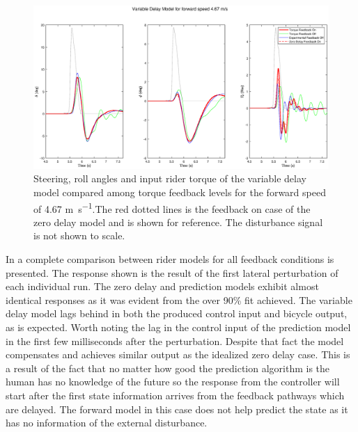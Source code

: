 \begin{figure}[!h]
    \centering
    \captionsetup{justification=centering,margin=2cm}

    \includegraphics[width=\textwidth]{images/predict_delay_compare2.eps}
    \caption{Steering, roll angles and input rider torque of the variable delay model  compared among torque feedback levels  for the forward speed of 4.67 \si{\meter\per\second}.The red dotted lines is the feedback on case of the zero delay model and is shown for reference. The disturbance signal is not shown  to scale.}
    \label{fig:paper10}
\end{figure}

In   a complete comparison between rider models for all feedback conditions is presented. The response shown is the result of the first lateral perturbation of each individual run. The zero delay and prediction models exhibit almost identical responses as it was evident from the over 90\% fit achieved. The variable delay model lags behind in both the produced control input and bicycle output, as is expected. Worth noting the lag in the control input of the prediction model in the first few milliseconds after the perturbation. Despite that fact the model compensates and achieves similar output as the idealized zero delay case. This is a result of the fact that no matter how good the prediction algorithm is the human has no knowledge of the future so the response from the controller will start after the first state information arrives from the feedback pathways which are delayed. The forward model in this case does not help predict the state as it has no information of the external disturbance. 





